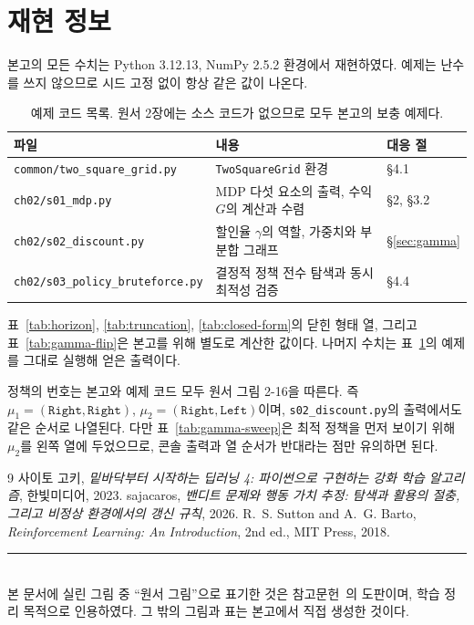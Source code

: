 \documentclass[11pt,a4paper]{article}
\begin{document}
\appendix
\section{재현 정보}

본고의 모든 수치는 Python 3.12.13, NumPy 2.5.2 환경에서 재현하였다. 예제는 난수를 쓰지 않으므로
시드 고정 없이 항상 같은 값이 나온다.

\begin{table}[htbp]
\centering
\caption{예제 코드 목록. 원서 2장에는 소스 코드가 없으므로 모두 본고의 보충 예제다.}
\label{tab:code}
\small
\begin{tabular}{@{}lll@{}}
\toprule
파일 & 내용 & 대응 절 \\
\midrule
\texttt{common/two\_square\_grid.py}      & \texttt{TwoSquareGrid} 환경                     & \S4.1 \\
\texttt{ch02/s01\_mdp.py}                 & MDP 다섯 요소의 출력, 수익 $G$의 계산과 수렴    & \S2, \S3.2 \\
\texttt{ch02/s02\_discount.py}            & 할인율 $\gamma$의 역할, 가중치와 부분합 그래프  & \S\ref{sec:gamma} \\
\texttt{ch02/s03\_policy\_bruteforce.py}  & 결정적 정책 전수 탐색과 동시 최적성 검증        & \S4.4 \\
\bottomrule
\end{tabular}
\end{table}

표~\ref{tab:horizon}, \ref{tab:truncation}, \ref{tab:closed-form}의 닫힌 형태 열, 그리고
표~\ref{tab:gamma-flip}은 본고를 위해 별도로 계산한 값이다. 나머지 수치는 표~\ref{tab:code}의 예제를
그대로 실행해 얻은 출력이다.

정책의 번호는 본고와 예제 코드 모두 원서 그림 2-16을 따른다. 즉 $\mu_1=(\texttt{Right},\texttt{Right})$,
$\mu_2=(\texttt{Right},\texttt{Left})$이며, \texttt{s02\_discount.py}의 출력에서도 같은 순서로 나열된다.
다만 표~\ref{tab:gamma-sweep}은 최적 정책을 먼저 보이기 위해 $\mu_2$를 왼쪽 열에 두었으므로, 콘솔
출력과 열 순서가 반대라는 점만 유의하면 된다.

\begin{thebibliography}{9}
사이토 고키, \emph{밑바닥부터 시작하는 딥러닝 4: 파이썬으로 구현하는 강화 학습 알고리즘}, 한빛미디어, 2023.
sajacaros, \emph{밴디트 문제와 행동 가치 추정: 탐색과 활용의 절충, 그리고 비정상 환경에서의 갱신 규칙}, 2026.
R.~S. Sutton and A.~G. Barto, \emph{Reinforcement Learning: An Introduction}, 2nd ed., MIT Press, 2018.
\end{thebibliography}

\vspace{4mm}
\noindent\rule{\linewidth}{0.4pt}\\
\footnotesize
본 문서에 실린 그림 중 ``원서 그림''으로 표기한 것은 참고문헌~\cite{dlfs4}의 도판이며, 학습 정리 목적으로
인용하였다. 그 밖의 그림과 표는 본고에서 직접 생성한 것이다.
\end{document}
